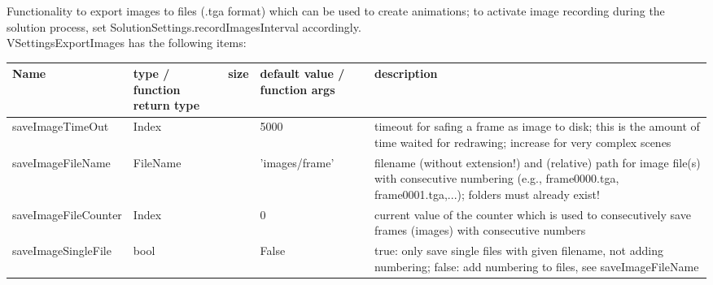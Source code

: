  \label{sec_VSettingsExportImages}
Functionality to export images to files (.tga format) which can be used to create animations; to activate image recording during the solution process, set SolutionSettings.recordImagesInterval accordingly.\\ 
%
VSettingsExportImages has the following items:
\begin{center}
  \footnotesize
  \begin{longtable}{| p{4.2cm} | p{2.5cm} | p{0.3cm} | p{3.0cm} | p{6cm} |}
    \hline
    \bf Name & \bf type / function return type & \bf size & \bf default value / function args & \bf description \\ \hline
    saveImageTimeOut &     Index &      &     5000 &     timeout for safing a frame as image to disk; this is the amount of time waited for redrawing; increase for very complex scenes\\ \hline
    saveImageFileName &     FileName &      &     'images/frame' &     filename (without extension!) and (relative) path for image file(s) with consecutive numbering (e.g., frame0000.tga, frame0001.tga,...); folders must already exist!\\ \hline
    saveImageFileCounter &     Index &      &     0 &     current value of the counter which is used to consecutively save frames (images) with consecutive numbers\\ \hline
    saveImageSingleFile &     bool &      &     False &     true: only save single files with given filename, not adding numbering; false: add numbering to files, see saveImageFileName\\ \hline
	  \end{longtable}
	\end{center}

